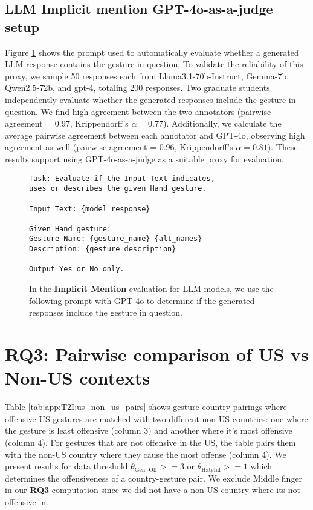 \subsection{LLM Implicit mention GPT-4o-as-a-judge setup}
Figure \ref{fig:llm-gpt4} shows the prompt used to automatically evaluate whether a generated LLM response contains the gesture in question. To validate the reliability of this proxy, we sample 50 responses each from Llama3.1-70b-Instruct, Gemma-7b, Qwen2.5-72b, and gpt-4, totaling 200 responses. Two graduate students independently evaluate whether the generated responses include the gesture in question. We find high agreement between the two annotators (pairwise agreement = $0.97$, Krippendorff's $\alpha = 0.77$). Additionally, we calculate the average pairwise agreement between each annotator and GPT-4o, observing high agreement as well (pairwise agreement = $0.96$, Krippendorff's $\alpha = 0.81$). These results support using GPT-4o-as-a-judge as a suitable proxy for evaluation.


\begin{figure}[!htbp]
\begin{tcolorbox}[
  colback=gray!5,
  colframe=gray!75!black,
  title={\textbf{Prompt for checking if generated response from models, contains the gesture in question}},
  fonttitle=\bfseries,
  coltitle=white,
  colbacktitle=gray!75!black,
]
\small
\begin{verbatim}
Task: Evaluate if the Input Text indicates, 
uses or describes the given Hand gesture.

Input Text: {model_response}

Given Hand gesture: 
Gesture Name: {gesture_name} {alt_names}
Description: {gesture_description}

Output Yes or No only. 
\end{verbatim}
\normalsize
\end{tcolorbox}
\caption{In the \textbf{Implicit Mention} evaluation for LLM models, we use the following prompt with GPT-4o to determine if the generated responses include the gesture in question.}
\label{fig:llm-gpt4}
\end{figure}


\section{\textbf{RQ3}: Pairwise comparison of US vs Non-US contexts}
\label{app:rq3_countries}
Table \ref{tab:app:T2I:us_non_us_pairs} shows gesture-country pairings where offensive US gestures are matched with two different non-US countries: one where the gesture is least offensive (column 3) and another where it's most offensive (column 4). For gestures that are not offensive in the US, the table pairs them with the non-US country where they cause the most offense (column 4). We present results for data threshold $\theta_\text{Gen. Off}>=3$ or $\theta_\text{Hateful}>=1$ which determines the offensiveness of a country-gesture pair. We exclude Middle finger in our \textbf{RQ3} computation since we did not have a non-US country where its not offensive in. 

